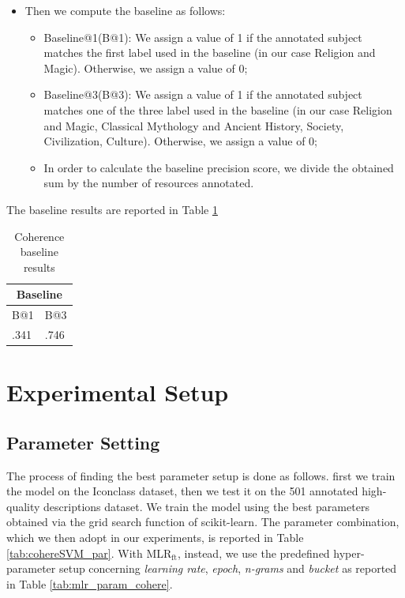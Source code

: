 \documentclass[epsfig,a4paper,12pt,titlepage]{book}
\newcommand{\mlr}{MLR$_\text{ft}$\xspace}
\begin{document}
\begin{itemize}
    \item Then we compute the baseline as follows:
    \begin{itemize}
        \item Baseline@1(B@1): We assign a value of 1 if the annotated subject matches the first label used in the baseline (in our case Religion and Magic). Otherwise, we assign a value of 0;
        \item Baseline@3(B@3): We assign a value of 1 if the annotated subject matches one of the three label used in the baseline (in our case Religion and Magic, Classical Mythology and Ancient History, Society, Civilization, Culture). Otherwise, we assign a value of 0;   
        \item In order to calculate the baseline precision score, we divide the obtained sum by the number of resources annotated.
    \end{itemize}
\end{itemize}
The baseline results are reported in Table \ref{tab:baseline_results_coherence}
    \begin{table}[H]
    \small 
\centering
\begin{adjustbox}{width=\textwidth}
\begin{tabular}{|p{8cm}|p{8cm}|} \hline

  \hline
  \multicolumn{2}{|c|}{Baseline} \\
  \hline
    B@1  & B@3  \\ \hline
    .341 & .746 \\ \hline
    \hline
\end{tabular}
\end{adjustbox}
    \caption{Coherence baseline results}
		\label{tab:baseline_results_coherence}       %
\end{table}


\section{Experimental Setup}
\label{experimental_setup_coherence}
\subsection{Parameter Setting}
\label{settings_cohere}
The process of finding the best parameter setup is done as follows. first we train the model on the Iconclass dataset, then we test it on the 501 annotated high-quality descriptions dataset.  We train the model using the best parameters obtained via the grid search function of scikit-learn. The parameter combination, which we then adopt in our experiments, is reported in Table \ref{tab:cohereSVM_par}. With \mlr, instead, we use the predefined hyper-parameter setup concerning \textit{learning rate}, \textit{epoch}, \textit{n-grams} and \textit{bucket} as reported in Table \ref{tab:mlr_param_cohere}.
\end{document}
